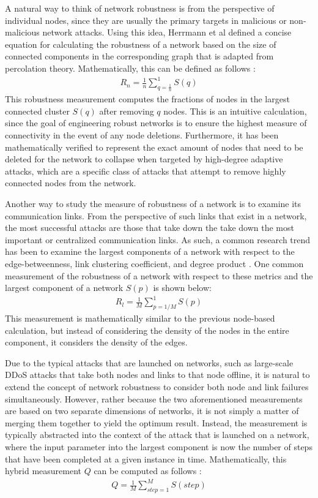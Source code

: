 \documentclass[doc]{apa}%
\begin{document}
A natural way to think of network robustness is from the perspective of individual nodes, since they are 
usually the primary targets in malicious or non-malicious network attacks. Using this idea, Herrmann et al
defined a concise equation for calculating the robustness of a network based on the size of connected
components in the corresponding graph that is adapted from percolation theory. Mathematically, this can be defined as follows \cite{Onion}:
\begin{eqnarray*}
R_{n} = \frac{1}{n}\sum_{q=\frac{1}{n}}^{1}S(q)
\end{eqnarray*}
This robustness measurement computes the fractions of nodes in the largest connected cluster $S(q)$ after removing $q$ nodes. This is an intuitive calculation, since the goal of engineering robust networks is to ensure the highest measure of connectivity in the event of any node deletions. Furthermore, it has been mathematically verified to represent the exact amount of nodes that need to be deleted for the network to collapse when targeted by high-degree adaptive attacks, which are a specific class of attacks that attempt to remove highly connected nodes from the network. 


Another way to study the measure of robustness of a network is to examine its communication links. From the perspective of such links that exist in a network, the most successful attacks are those that take down the take down the most important or centralized communication links. As such, a common research trend has been to examine the largest components of a network with respect to the edge-betweenness, link clustering coefficient, and degree product \cite{NRMalicious}. One common measurement of the robustness of a network with respect to these metrics and the largest component of a network $S(p)$ is shown below:
\begin{eqnarray*}
R_l = \frac{1}{M}\sum_{p = 1/M}^{1}S(p)
\end{eqnarray*}
This measurement is mathematically similar to the previous node-based calculation, but instead of considering the density of the nodes in the entire component, it considers the density of the edges. 

Due to the typical attacks that are launched on networks, such as large-scale DDoS attacks that take both nodes and links to that node offline, it is natural to extend the concept of network robustness to consider both node and link failures simultaneously. However, rather because the two aforementioned measurements are based on two separate dimensions of networks, it is not simply a matter of merging them together to yield the optimum result. Instead, the measurement is typically abstracted into the context of the attack that is launched on a network, where the input parameter into the largest component is now the number of steps that have been completed at a given instance in time. Mathematically, this hybrid measurement $Q$ can be computed as follows \cite{NRMalicious}:
\begin{eqnarray*}
Q = \frac{1}{M}\sum_{step  = 1}^{M}S(step)
\end{eqnarray*}
\end{document}
